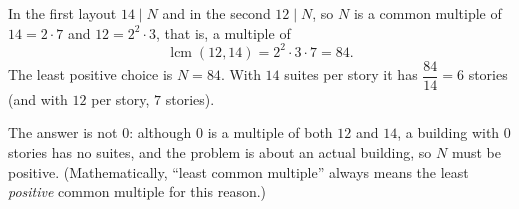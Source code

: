 In the first layout $14\mid N$ and in the second $12\mid N$, so $N$ is a common multiple of $14=2\cdot7$ and $12=2^2\cdot3$, that is, a multiple of
\[
\operatorname{lcm}(12,14)=2^2\cdot3\cdot7=84 .
\]
The least positive choice is $N=84$. With $14$ suites per story it has $\dfrac{84}{14}=\boxed{6}$ stories (and with $12$ per story, $7$ stories).

The answer is not $0$: although $0$ is a multiple of both $12$ and $14$, a building with $0$ stories has no suites, and the problem is about an actual building, so $N$ must be positive. (Mathematically, ``least common multiple'' always means the least \emph{positive} common multiple for this reason.)

